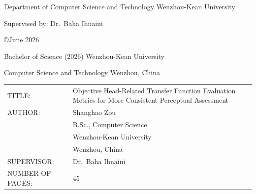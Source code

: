 \documentclass[12pt,a4paper]{article}
\begin{document}
\vspace{1cm}

\begin{center}
Department of Computer Science and Technology Wenzhou-Kean University
\end{center}

\vspace{0.5cm}

\begin{center}
Supervised by: Dr.\ Baha Ihnaini
\end{center}

\vfill  %

\newpage
\thispagestyle{empty}
\setcounter{page}{2}

\vspace*{2cm}

\begin{center}
\copyright June 2026
\end{center}

\vspace{3cm}

\noindent Bachelor of Science (2026) \hfill Wenzhou-Kean University

\vspace{0.3cm}

\noindent Computer Science and Technology \hfill Wenzhou, China

\vspace{1.5cm}

\noindent
\begin{tabular}{@{}p{4.5cm}p{9.5cm}@{}}
TITLE: & Objective Head-Related Transfer Function Evaluation Metrics for More Consistent Perceptual Assessment \\[1em]
AUTHOR: & Shanghao Zou \\
         & B.Sc., Computer Science \\
         & Wenzhou-Kean University \\
         & Wenzhou, China \\[1em]
SUPERVISOR: & Dr.\ Baha Ihnaini \\[1.5em]
NUMBER OF PAGES: & 45 \\
\end{tabular}

\vfill

\newpage
\end{document}
